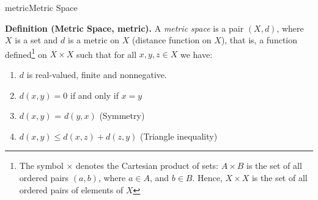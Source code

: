 \documentclass[9pt]{article}
\begin{document}
\begin{topic}{metric}{Metric Space}
\Working

\textbf{Definition (Metric Space, metric).} A \textit{metric space} is a pair $(X,d)$, where $X$ is a set and $d$ is a metric on $X$ (distance function on $X$), that is, a function defined\footnote[1]{The symbol $\times$ denotes the Cartesian product of sets: $A \times B$ is the set of all ordered pairs $(a,b)$, where $a \in A$, and $b \in B$. Hence, $X \times X$ is the set of all ordered pairs of elements of $X$} on $X \times X$ such that for all $x,y,z \in X$ we have:
\begin{enumerate}
\item $d$ is real-valued, finite and nonnegative.
\item $d(x,y) = 0$ if and only if $x=y$
\item $d(x,y)$ = $d(y,x)$  (Symmetry)
\item $d(x,y) \le d(x,z) + d(z,y)$   (Triangle inequality)
\end{enumerate}


\end{topic}
\end{document}
